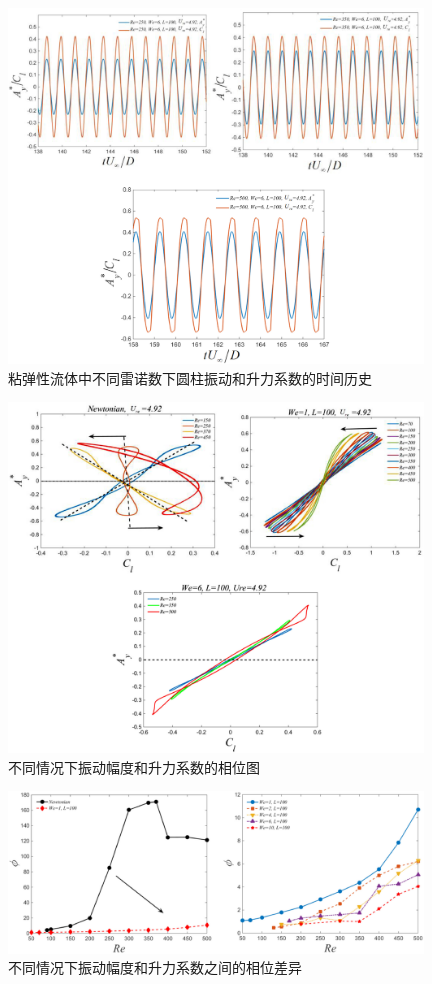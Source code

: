 \documentclass[UTF8,zihao=5]{ctexart} %
\begin{document}
\begin{figure}[htbp]
    \centering
    \includegraphics[width=11cm]{fig12.jpg}
    \caption{
        粘弹性流体中不同雷诺数下圆柱振动和升力系数的时间历史
    }
    \label{fig:12}
\end{figure}

\begin{figure}[htbp]
    \centering
    \includegraphics[width=11cm]{fig13.jpg}
    \caption{
        不同情况下振动幅度和升力系数的相位图
    }
    \label{fig:13}
\end{figure}

\begin{figure}[htbp]
    \centering
    \includegraphics[width=11cm]{fig14.jpg}
    \caption{
        不同情况下振动幅度和升力系数之间的相位差异
    }
    \label{fig:14}
\end{figure}
\end{document}
